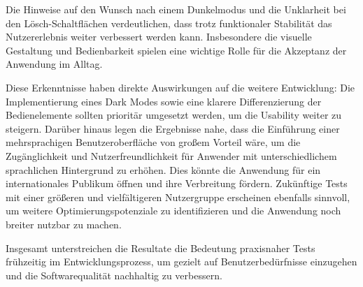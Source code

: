 Die Hinweise auf den Wunsch nach einem Dunkelmodus und die Unklarheit bei den Lösch-Schaltflächen verdeutlichen,
dass trotz funktionaler Stabilität das Nutzererlebnis weiter verbessert werden kann. Insbesondere die visuelle 
Gestaltung und Bedienbarkeit spielen eine wichtige Rolle für die Akzeptanz der Anwendung im Alltag.

Diese Erkenntnisse haben direkte Auswirkungen auf die weitere Entwicklung: Die Implementierung eines Dark Modes
sowie eine klarere Differenzierung der Bedienelemente sollten prioritär umgesetzt werden, um die Usability weiter 
zu steigern. Darüber hinaus legen die Ergebnisse nahe, dass die Einführung einer mehrsprachigen Benutzeroberfläche
von großem Vorteil wäre, um die Zugänglichkeit und Nutzerfreundlichkeit für Anwender mit unterschiedlichem sprachlichen
Hintergrund zu erhöhen. Dies könnte die Anwendung für ein internationales Publikum öffnen und ihre Verbreitung fördern.
Zukünftige Tests mit einer größeren und vielfältigeren Nutzergruppe erscheinen ebenfalls sinnvoll,
um weitere Optimierungspotenziale zu identifizieren und die Anwendung noch breiter nutzbar zu machen.

Insgesamt unterstreichen die Resultate die Bedeutung praxisnaher Tests frühzeitig im Entwicklungsprozess,
um gezielt auf Benutzerbedürfnisse einzugehen und die Softwarequalität nachhaltig zu verbessern.